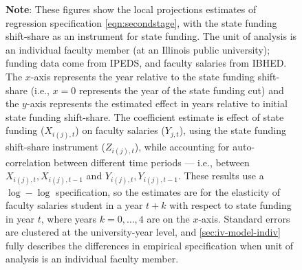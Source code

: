 \begin{figure}[H]
\begin{subfigure}[b]{0.495\textwidth}
        \label{fig:salaries-administrator-illinois-lp-rolling}
    \end{subfigure}
    \label{fig:salaries-illinois-lp-rolling}
    \vspace{-1cm}
    \justify
    \footnotesize
    \textbf{Note}:
    These figures show the local projections estimates of regression specification \eqref{eqn:secondstage}, with the state funding shift-share as an instrument for state funding.
    The unit of analysis is an individual faculty member (at an Illinois public university); funding data come from IPEDS, and faculty salaries from IBHED.
    The $x$-axis represents the year relative to the state funding shift-share (i.e., $x = 0$ represents the year of the state funding cut) and the $y$-axis represents the estimated effect in years relative to initial state funding shift-share.
    The coefficient estimate is effect of state funding ($X_{i(j),t}$) on faculty salaries ($Y_{j,t}$), using the state funding shift-share instrument ($Z_{i(j),t}$), while accounting for auto-correlation between different time periods --- i.e., between $X_{i(j),t}, X_{i(j),t-1}$ and $Y_{i(j),t}, Y_{i(j),t-1}$.
    These results use a $\log-\log$ specification, so the estimates are for the elasticity of faculty salaries student in a year $t+k$ with respect to state funding in year $t$, where years $k = 0, \hdots, 4$ are on the $x$-axis. 
    Standard errors are clustered at the university-year level, and \autoref{sec:iv-model-indiv} fully describes the differences in empirical specification when unit of analysis is an individual faculty member.
\end{figure}

